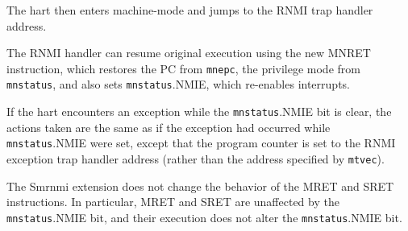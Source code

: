 The hart then enters machine-mode and jumps to the RNMI trap handler
address.

The RNMI handler can resume original execution using the new MNRET
instruction, which restores the PC from {\tt mnepc}, the privilege mode
from {\tt mnstatus}, and also sets {\tt mnstatus}.NMIE, which
re-enables interrupts.

If the hart encounters an exception while the {\tt mnstatus}.NMIE bit is
clear, the actions taken are the same as if the exception had occurred while
{\tt mnstatus}.NMIE were set, except that the program counter is set to the
RNMI exception trap handler address (rather than the address specified by
{\tt mtvec}).

\begin{commentary}
The Smrnmi extension does not change the behavior of the MRET and SRET
instructions.
In particular, MRET and SRET are unaffected by the {\tt mnstatus}.NMIE bit,
and their execution does not alter the {\tt mnstatus}.NMIE bit.
\end{commentary}
